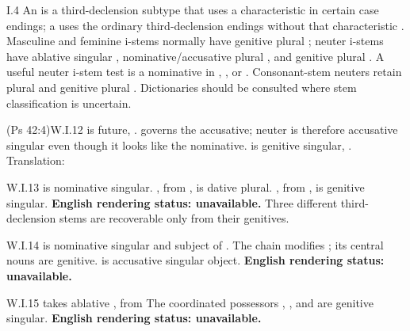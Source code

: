 \begin{courseunit}{I.4}
An  is a third-declension subtype that uses a characteristic
 in certain case endings; a  uses the ordinary
third-declension endings without that characteristic . Masculine and
feminine i-stems normally have genitive plural ;
neuter i-stems have ablative singular , nominative/accusative plural
, and genitive plural . A useful neuter i-stem test is
a nominative in , , or . Consonant-stem neuters
retain plural  and genitive plural . Dictionaries should
be consulted where stem classification is uncertain.

\begin{workedexample}{ (Ps 42:4)}{W.I.12}
 is future, .  governs the
accusative; neuter  is therefore accusative singular even though
it looks like the nominative.  is genitive singular,
. Translation: 
\end{workedexample}

\begin{workedexample}{}{W.I.13}
 is nominative singular. , from
, is dative plural. , from
, is genitive singular.
\textbf{English rendering status: unavailable.} Three different third-declension stems
are recoverable only from their genitives.
\end{workedexample}

\begin{workedexample}{}{W.I.14}
 is nominative singular and subject of
. The chain  modifies
; its central nouns are genitive.  is
accusative singular object. \textbf{English rendering status: unavailable.}
\end{workedexample}

\begin{workedexample}{}{W.I.15}
 takes ablative , from 
The coordinated possessors , , and
 are genitive singular.
\textbf{English rendering status: unavailable.}
\end{workedexample}


\end{courseunit}
